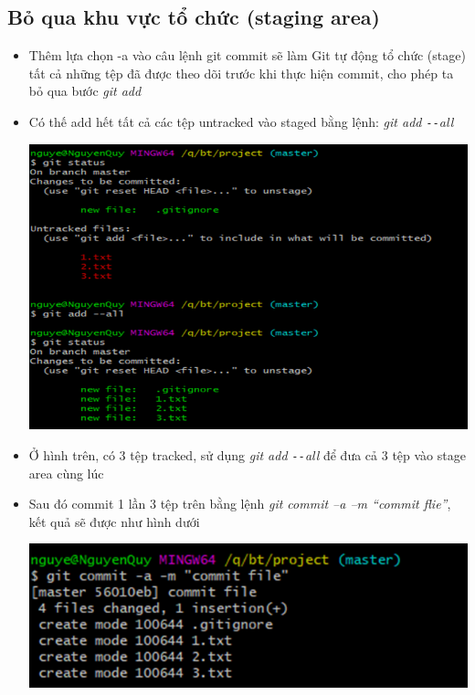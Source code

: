 \documentclass[12pt,a4paper]{report}
\begin{document}
\subsection{Bỏ qua khu vực tổ chức (staging area)}
\begin{itemize}
\item Thêm lựa chọn -a vào câu lệnh git commit sẽ làm Git tự động tổ chức (stage) tất cả những tệp đã được theo dõi trước khi thực hiện commit, cho phép ta bỏ qua bước \textit{git add}
\item Có thế add hết tất cả các tệp untracked vào staged bằng lệnh: {\it git add \texttt{-{}-}all}

	\includegraphics[width=0.8\linewidth]{screenshot013}

	\label{fig:screenshot013}

\item Ở hình trên, có 3 tệp tracked, sử dụng {\it git add \texttt{-{}-}all} để đưa cả 3 tệp vào stage area cùng lúc
\item Sau đó commit 1 lần 3 tệp trên bằng lệnh {\it git commit –a –m “commit flie”}, kết quả sẽ được như hình dưới

	\includegraphics[width=0.8\linewidth]{screenshot014}

	\label{fig:screenshot014}
\end{itemize}
\end{document}

